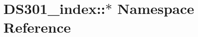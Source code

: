 \hypertarget{namespaceDS301__index_1_1_5}{
\section{DS301\_\-index::$\ast$ Namespace Reference}
\label{namespaceDS301__index_1_1_5}
}



